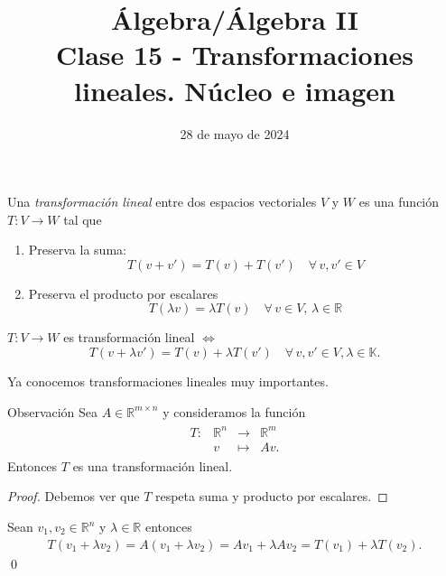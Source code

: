 \documentclass{beamer} %
\title[Clase 15 - Transformaciones lineales. Núcleo e imagen]{Álgebra/Álgebra II \\Clase 15 - Transformaciones lineales. Núcleo e imagen}
\author[]{}
\institute[]{\normalsize FAMAF / UNC
    \\[\baselineskip] ${}^{}$
    \\[\baselineskip]
}
\date[28/05/2024]{28 de mayo de 2024}
\newcommand{\R}{\mathbb R}
\newcommand{\K}{\mathbb K}
\begin{document}
\begin{frame}
\maketitle
\end{frame}




\begin{frame}
    \begin{definicion}
    Una \textit{transformación lineal} entre dos espacios vectoriales $V$ y $W$ es una función $T:V\longrightarrow W$ tal que \pause
    \begin{enumerate}
     \item Preserva la suma: 
     $$
     T(v+v')=T(v)+T(v')
     \quad\forall\,v,v'\in V
     $$\pause
     \item Preserva el producto por escalares
     $$
     T(\lambda v)=\lambda T(v)
     \quad\forall\,v\in V,\,\lambda\in\R
     $$ 
    \end{enumerate}
    
    \end{definicion}
    \pause
    \begin{observacion}
        $T:V\longrightarrow W$  es transformación lineal  $\Leftrightarrow$ 
        $$
        T(v+\lambda v')=T(v)+\lambda T(v')\quad\forall\,v,v'\in V, \lambda \in \K.
        $$
    
    \end{observacion}
    
\end{frame}



\begin{frame}

    Ya conocemos transformaciones lineales muy importantes.\pause

    \begin{block}{Observación}\label{obs-matriz->tl}
    Sea $A\in\R^{m\times n}$ y consideramos la función 
    \begin{align*}
    \begin{array}{rccc}
        T : &\R^n &\to &\R^m \\
            &v &\mapsto &Av.
    \end{array}
    \end{align*}
    Entonces $T$ es una transformación lineal. \pause
    \end{block}
    \begin{proof}\pause
        Debemos ver que $T$ respeta suma y producto por escalares.
    \end{proof}
    
    \pause
    Sean $v_1,v_2\in\R^n$ y $\lambda\in\R$ entonces
    \begin{align*}
    T(v_1+\lambda v_2)=A(v_1+\lambda v_2)=
    Av_1+\lambda Av_2=T(v_1)+\lambda T(v_2).
    \end{align*}
    \qed
    
    
    \end{frame}
\end{document}
